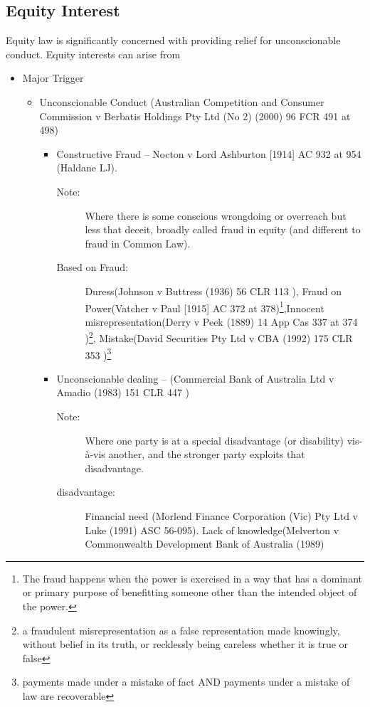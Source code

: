 \subsection{Equity Interest}
Equity law is significantly concerned with providing relief for unconscionable conduct. Equity interests can arise from 
\begin{itemize}
    \item Major Trigger
        \begin{itemize}
            \item Unconscionable Conduct (Australian Competition and Consumer Commission v Berbatis Holdings Pty Ltd (No 2) (2000) 96 FCR 491 at 498)
                \begin{itemize}
                    \item Constructive Fraud --  Nocton v Lord Ashburton [1914] AC 932 at 954 (Haldane LJ).
                        \begin{description}
                            \item[Note:] Where there is some conscious wrongdoing or overreach but less that deceit, broadly called fraud in equity (and different to fraud in Common Law). 
                            \item[Based on Fraud:] Duress(Johnson v Buttress (1936) 56 CLR 113 ), Fraud on Power(Vatcher v Paul [1915] AC 372 at 378)\footnote{The fraud happens when the power is exercised in a way that has a dominant or primary purpose of benefitting someone other than the intended object of the power.},Innocent misrepresentation(Derry v Peek (1889) 14 App Cas 337 at 374 )\footnote{a fraudulent misrepresentation as a false representation made knowingly, without belief in its truth, or recklessly being careless whether it is true or false}, Mistake(David Securities Pty Ltd v CBA (1992) 175 CLR 353 )\footnote{payments made under a mistake of fact AND payments under a mistake of law are recoverable}
                        \end{description}
                    \item Unconscionable dealing -- (Commercial Bank of Australia Ltd v Amadio (1983) 151 CLR 447 )
                        \begin{description}
                            \item[Note:] Where one party is at a special disadvantage (or disability) vis-à-vis another, and the stronger party exploits that disadvantage. 
                            \item[disadvantage:]Financial need (Morlend Finance Corporation (Vic) Pty Ltd v Luke (1991) ASC 56-095). Lack of knowledge(Melverton v Commonwealth Development Bank of Australia (1989)

\end{description}
\end{itemize}
\end{itemize}
\end{itemize}
